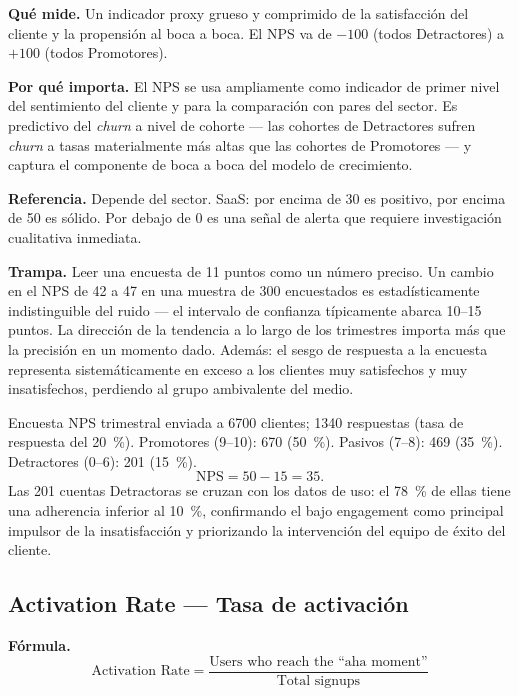 \textbf{Qué mide.} Un indicador proxy grueso y comprimido de la satisfacción del cliente y
la propensión al boca a boca. El NPS va de $-100$ (todos Detractores) a $+100$ (todos
Promotores).

\textbf{Por qué importa.} El NPS se usa ampliamente como indicador de primer nivel del
sentimiento del cliente y para la comparación con pares del sector. Es predictivo del
\emph{churn} a nivel de cohorte --- las cohortes de Detractores sufren \emph{churn} a tasas
materialmente más altas que las cohortes de Promotores --- y captura el componente de boca a
boca del modelo de crecimiento.

\textbf{Referencia.} Depende del sector. SaaS: por encima de 30 es positivo, por encima de
50 es sólido. Por debajo de 0 es una señal de alerta que requiere investigación cualitativa
inmediata.

\textbf{Trampa.} Leer una encuesta de 11 puntos como un número preciso. Un cambio en el NPS
de 42 a 47 en una muestra de 300 encuestados es estadísticamente indistinguible del ruido
--- el intervalo de confianza típicamente abarca 10--15 puntos. La dirección de la tendencia
a lo largo de los trimestres importa más que la precisión en un momento dado. Además: el
sesgo de respuesta a la encuesta representa sistemáticamente en exceso a los clientes muy
satisfechos y muy insatisfechos, perdiendo al grupo ambivalente del medio.

\begin{example}
Encuesta NPS trimestral enviada a \num{6700} clientes; \num{1340} respuestas (tasa de
respuesta del \qty{20}{\percent}). Promotores (9--10): 670 (\qty{50}{\percent}). Pasivos
(7--8): 469 (\qty{35}{\percent}). Detractores (0--6): 201 (\qty{15}{\percent}).
\[
  \mathrm{NPS} = 50 - 15 = 35.
\]
Las 201 cuentas Detractoras se cruzan con los datos de uso: el \qty{78}{\percent} de ellas
tiene una adherencia inferior al \qty{10}{\percent}, confirmando el bajo engagement como
principal impulsor de la insatisfacción y priorizando la intervención del equipo de éxito
del cliente.
\end{example}


\subsection{Activation Rate --- Tasa de activación}

\textbf{Fórmula.}
\[
  \text{Activation Rate} = \frac{\text{Users who reach the ``aha moment''}}{\text{Total signups}}
\]

